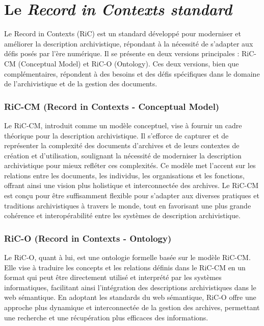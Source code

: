 \documentclass[12pt]{report}
\begin{document}
\chapter{Le \textit{Record in Contexts standard}}
Le Record in Contexts (RiC) est un standard développé pour moderniser et améliorer la description archivistique, répondant à la nécessité de s'adapter aux défis posés par l'ère numérique\autocite{Duranti2001Impact, Taylor1987Transformation, MacNeil2007ArchivalTheory}. Il se présente en deux versions principales : RiC-CM (Conceptual Model) et RiC-O (Ontology). Ces deux versions, bien que complémentaires, répondent à des besoins et des défis spécifiques dans le domaine de l'archivistique et de la gestion des documents.

\subsection{RiC-CM (Record in Contexts - Conceptual Model)}

Le RiC-CM, introduit comme un modèle conceptuel, vise à fournir un cadre théorique pour la description archivistique. Il s'efforce de capturer et de représenter la complexité des documents d'archives et de leurs contextes de création et d'utilisation, soulignant la nécessité de moderniser la description archivistique pour mieux refléter ces complexités. Ce modèle met l'accent sur les relations entre les documents, les individus, les organisations et les fonctions, offrant ainsi une vision plus holistique et interconnectée des archives\autocite{ICA2016}. Le RiC-CM est conçu pour être suffisamment flexible pour s'adapter aux diverses pratiques et traditions archivistiques à travers le monde, tout en favorisant une plus grande cohérence et interopérabilité entre les systèmes de description archivistique.

\subsection{RiC-O (Record in Contexts - Ontology)}

Le RiC-O, quant à lui, est une ontologie formelle basée sur le modèle RiC-CM. Elle vise à traduire les concepts et les relations définis dans le RiC-CM en un format qui peut être directement utilisé et interprété par les systèmes informatiques, facilitant ainsi l'intégration des descriptions archivistiques dans le web sémantique\autocite{ICARiCOv02}. En adoptant les standards du web sémantique, RiC-O offre une approche plus dynamique et interconnectée de la gestion des archives, permettant une recherche et une récupération plus efficaces des informations.
\end{document}
